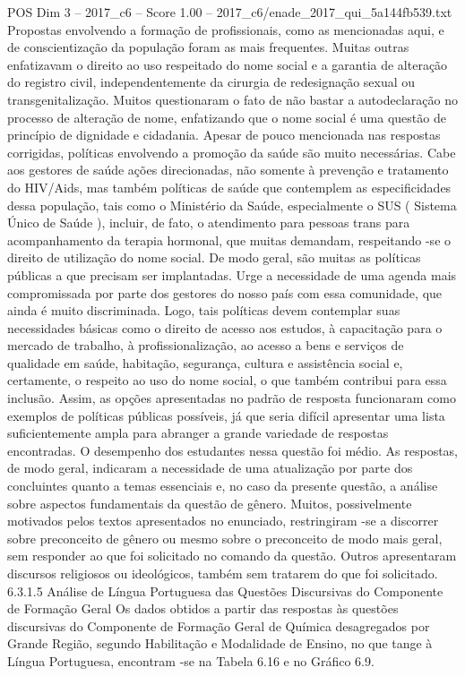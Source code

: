 \begin{textsample}{POS Dim 3 – 2017\_c6 – Score 1.00 – 2017\_c6/enade\_2017\_qui\_5a144fb539.txt}
Propostas envolvendo a formação de profissionais, como as mencionadas aqui, e de conscientização da população foram as mais frequentes.
Muitas outras enfatizavam o direito ao uso respeitado do nome social e a garantia de alteração do registro civil, independentemente da cirurgia de redesignação sexual ou transgenitalização.
Muitos questionaram o fato de não bastar a autodeclaração no processo de alteração de nome, enfatizando que o nome social é uma questão de princípio de dignidade e cidadania.
Apesar de pouco mencionada nas respostas corrigidas, políticas envolvendo a promoção da saúde são muito necessárias.
Cabe aos gestores de saúde ações direcionadas, não somente à prevenção e tratamento do HIV/Aids, mas também políticas de saúde que contemplem as especificidades dessa população, tais como o Ministério da Saúde, especialmente o SUS ( Sistema Único de Saúde ), incluir, de fato, o atendimento para pessoas trans para acompanhamento da terapia hormonal, que muitas demandam, respeitando -se o direito de utilização do nome social.
De modo geral, são muitas as políticas públicas a que precisam ser implantadas.
Urge a necessidade de uma agenda mais compromissada por parte dos gestores do nosso país com essa comunidade, que ainda é muito discriminada.
Logo, tais políticas devem contemplar suas necessidades básicas como o direito de acesso aos estudos, à capacitação para o mercado de trabalho, à profissionalização, ao acesso a bens e serviços de qualidade em saúde, habitação, segurança, cultura e assistência social e, certamente, o respeito ao uso do nome social, o que também contribui para essa inclusão.
Assim, as opções apresentadas no padrão de resposta funcionaram como exemplos de políticas públicas possíveis, já que seria difícil apresentar uma lista suficientemente ampla para abranger a grande variedade de respostas encontradas.
O desempenho dos estudantes nessa questão foi médio.
As respostas, de modo geral, indicaram a necessidade de uma atualização por parte dos concluintes quanto a temas essenciais e, no caso da presente questão, a análise sobre aspectos fundamentais da questão de gênero.
Muitos, possivelmente motivados pelos textos apresentados no enunciado, restringiram -se a discorrer sobre preconceito de gênero ou mesmo sobre o preconceito de modo mais geral, sem responder ao que foi solicitado no comando da questão.
Outros apresentaram discursos religiosos ou ideológicos, também sem tratarem do que foi solicitado. 6.3.1.5 Análise de Língua Portuguesa das Questões Discursivas do Componente de Formação Geral Os dados obtidos a partir das respostas às questões discursivas do Componente de Formação Geral de Química desagregados por Grande Região, segundo Habilitação e Modalidade de Ensino, no que tange à Língua Portuguesa, encontram -se na Tabela 6.16 e no Gráfico 6.9.

\end{textsample}
